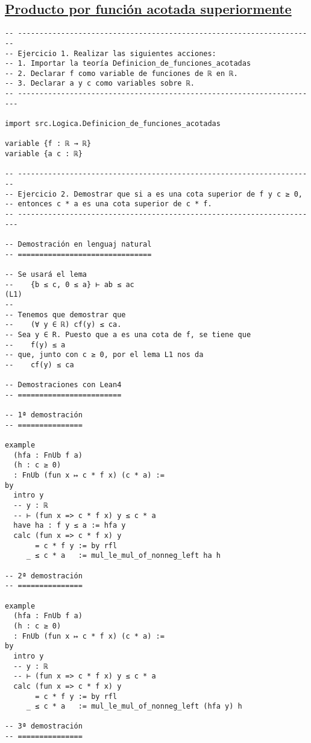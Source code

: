 \subsection{\href{./src/Logica/Producto\_por\_funcion\_acotada\_superiormente.lean}{Producto por función acotada superiormente}}
\label{sec:orgf7ad9eb}
\begin{verbatim}
-- ---------------------------------------------------------------------
-- Ejercicio 1. Realizar las siguientes acciones:
-- 1. Importar la teoría Definicion_de_funciones_acotadas
-- 2. Declarar f como variable de funciones de ℝ en ℝ.
-- 3. Declarar a y c como variables sobre ℝ.
-- ----------------------------------------------------------------------

import src.Logica.Definicion_de_funciones_acotadas

variable {f : ℝ → ℝ}
variable {a c : ℝ}

-- ---------------------------------------------------------------------
-- Ejercicio 2. Demostrar que si a es una cota superior de f y c ≥ 0,
-- entonces c * a es una cota superior de c * f.
-- ----------------------------------------------------------------------

-- Demostración en lenguaj natural
-- ===============================

-- Se usará el lema
--    {b ≤ c, 0 ≤ a} ⊢ ab ≤ ac                                      (L1)
--
-- Tenemos que demostrar que
--    (∀ y ∈ ℝ) cf(y) ≤ ca.
-- Sea y ∈ R. Puesto que a es una cota de f, se tiene que
--    f(y) ≤ a
-- que, junto con c ≥ 0, por el lema L1 nos da
--    cf(y) ≤ ca

-- Demostraciones con Lean4
-- ========================

-- 1ª demostración
-- ===============

example
  (hfa : FnUb f a)
  (h : c ≥ 0)
  : FnUb (fun x ↦ c * f x) (c * a) :=
by
  intro y
  -- y : ℝ
  -- ⊢ (fun x => c * f x) y ≤ c * a
  have ha : f y ≤ a := hfa y
  calc (fun x => c * f x) y
       = c * f y := by rfl
     _ ≤ c * a   := mul_le_mul_of_nonneg_left ha h

-- 2ª demostración
-- ===============

example
  (hfa : FnUb f a)
  (h : c ≥ 0)
  : FnUb (fun x ↦ c * f x) (c * a) :=
by
  intro y
  -- y : ℝ
  -- ⊢ (fun x => c * f x) y ≤ c * a
  calc (fun x => c * f x) y
       = c * f y := by rfl
     _ ≤ c * a   := mul_le_mul_of_nonneg_left (hfa y) h

-- 3ª demostración
-- ===============


\end{verbatim}
